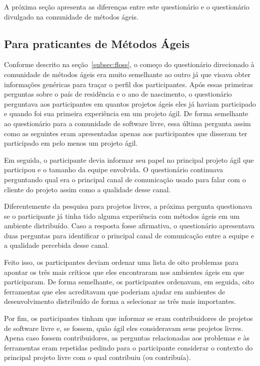 A próxima seção apresenta as diferenças entre este questionário e o
questionário divulgado na comunidade de métodos ágeis.

\subsection{Para praticantes de Métodos Ágeis}
\label{subsec:agile}

Conforme descrito na seção~\ref{subsec:floss}, o começo do
questionário direcionado à comunidade de métodos ágeis era muito
semelhante ao outro já que visava obter informações genéricas para
traçar o perfil dos participantes.  Após essas primeiras perguntas
sobre o país de residência e o ano de nascimento, o questionário
perguntava aos participantes em quantos projetos ágeis eles já haviam
participado e quando foi sua primeira experiência em um projeto ágil.
De forma semelhante ao questionário para a comunidade de software
livre, essa última pergunta assim como as seguintes eram apresentadas
apenas aos participantes que disseram ter participado em pelo menos um
projeto ágil.

Em seguida, o participante devia informar seu papel no principal
projeto ágil que participou e o tamanho da equipe envolvida. O
questionário continuava perguntando qual era o principal canal de
comunicação usado para falar com o cliente do projeto assim como a
qualidade desse canal.

Diferentemente da pesquisa para projetos livres, a próxima pergunta
questionava se o participante já tinha tido alguma experiência com
métodos ágeis em um ambiente distribuído. Caso a resposta fosse
afirmativa, o questionário apresentava duas perguntas para identificar
o principal canal de comunicação entre a equipe e a qualidade
percebida desse canal.

Feito isso, os participantes deviam ordenar uma lista de oito
problemas para apontar os três mais críticos que eles encontraram nos
ambientes ágeis em que participaram. De forma semelhante, os
participantes ordenavam, em seguida, oito ferramentas que eles
acreditavam que poderiam ajudar em ambientes de desenvolvimento
distribuído de forma a selecionar as três mais importantes.

Por fim, os participantes tinham que informar se eram contribuidores
de projetos de software livre e, se fossem, quão ágil eles
consideravam seus projetos livres. Apena caso fossem contribuidores,
as perguntas relacionadas aos problemas e às ferramentas eram
repetidas pedindo para o participante considerar o contexto do
principal projeto livre com o qual contribuiu (ou contribuía).

